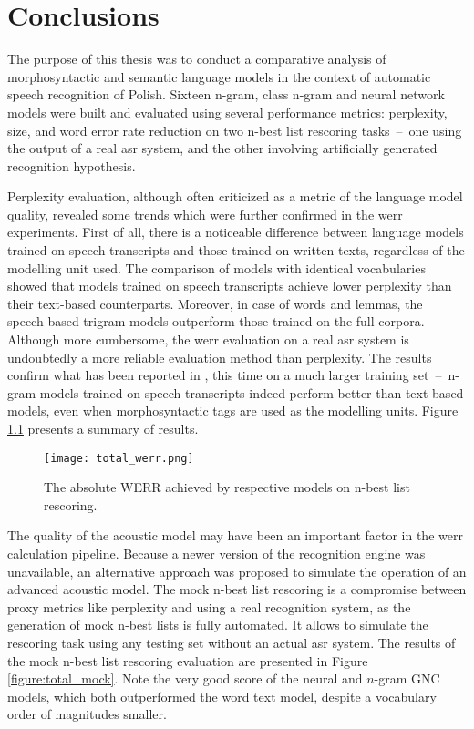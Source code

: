 \chapter{Conclusions}
\label{chapter:conclusion}
The purpose of this thesis was to conduct a comparative analysis of morphosyntactic and semantic language models in the context of automatic speech recognition of Polish. Sixteen n-gram, class n-gram and neural network models were built and evaluated using several performance metrics: perplexity, size, and word error rate reduction on two n-best list rescoring tasks~--~one using the output of a real \gls{asr} system, and the other involving artificially generated recognition hypothesis.

Perplexity evaluation, although often criticized as a metric of the language model quality, revealed some trends which were further confirmed in the \gls{werr} experiments. First of all, there is a noticeable difference between language models trained on speech transcripts and those trained on written texts, regardless of the modelling unit used. The comparison of models with identical vocabularies showed that models trained on speech transcripts achieve lower perplexity than their text-based counterparts. Moreover, in case of words and lemmas, the speech-based trigram models outperform those trained on the full corpora.
Although more cumbersome, the \gls{werr} evaluation on a real \gls{asr} system is undoubtedly a more reliable evaluation method than perplexity. The results confirm what has been reported in \cite{dziadzio2015comparison}, this time on a much larger training set~--~n-gram models trained on speech transcripts indeed perform better than text-based models, even when morphosyntactic tags are used as the modelling units. Figure \ref{figure:total} presents a summary of results.

\begin{figure}[!htbp]
	  \centering
	  \texttt{[image: total\_werr.png]}
	  \caption[The absolute WERR achieved by respective models on n-best list rescoring]{The absolute WERR achieved by respective models on n-best list rescoring.}
	      \label{figure:total}
\end{figure}

The quality of the acoustic model may have been an important factor in the \gls{werr} calculation pipeline. Because a newer version of the recognition engine was unavailable, an alternative approach was proposed to simulate the operation of an advanced acoustic model. The mock n-best list rescoring is a compromise between proxy metrics like perplexity and using a real recognition system, as the generation of mock n-best lists is fully automated. It allows to simulate the rescoring task using any testing set without an actual \gls{asr} system. The results of the mock n-best list rescoring evaluation are presented in Figure \ref{figure:total_mock}. Note the very good score of the neural and \mbox{$n$-gram} GNC models, which both outperformed the word text model, despite a vocabulary order of magnitudes smaller.

